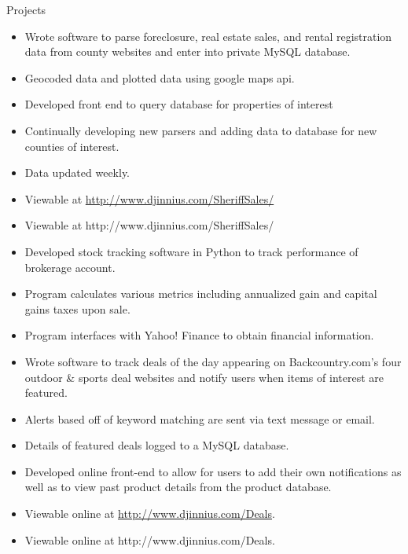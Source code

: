 \begin{category}{Projects}
\begin{itemize}
{\end{itemize}


\begin{itemize}
\item Wrote software to parse foreclosure, real estate sales, and rental registration data from county websites and enter into private MySQL database.
\item Geocoded data and plotted data using google maps api.
\item Developed front end to query database for properties of interest
\item Continually developing new parsers and adding data to database for new counties of interest.
\item Data updated weekly.

\ifDjinniusLinks
\ifWebLinks
\item Viewable at \href{ http://www.djinnius.com/SheriffSales/ }{ http://www.djinnius.com/SheriffSales/}
\else
\item Viewable at  http://www.djinnius.com/SheriffSales/
\fi
\fi

\end{itemize}

\begin{itemize}
\item Developed stock tracking software in Python to track performance of brokerage account.
\item Program calculates various metrics including annualized gain and capital gains taxes upon sale.
\item Program interfaces with Yahoo! Finance to obtain financial information.
\end{itemize}



\begin{itemize}
\item Wrote software to track deals of the day appearing on Backcountry.com's four outdoor \& sports deal websites and notify users when items of interest are featured.
\item Alerts based off of keyword matching are sent via text message or email.
\item Details of featured deals logged to a MySQL database. 
\item Developed online front-end to allow for users to add their own notifications as well as to view past product details from the product database.
\ifDjinniusLinks
\ifWebLinks
\item Viewable online at \href{ http://www.djinnius.com/Deals/ }{http://www.djinnius.com/Deals}.
\else
\item Viewable online at http://www.djinnius.com/Deals.
\fi
\fi
\end{itemize}


\end{category}
